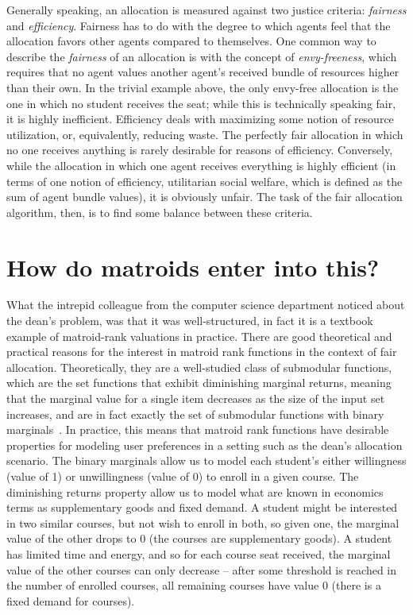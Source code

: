 Generally speaking, an allocation is measured against two justice criteria: \textit{fairness} and \textit{efficiency}. Fairness has to do with the degree to which agents feel that the allocation favors other agents compared to themselves. One common way to describe the \textit{fairness} of an allocation is with the concept of \textit{envy-freeness}, which requires that no agent values another agent's received bundle of resources higher than their own. In the trivial example above, the only envy-free allocation is the one in which no student receives the seat; while this is technically speaking fair, it is highly inefficient. Efficiency deals with maximizing some notion of resource utilization, or, equivalently, reducing waste. The perfectly fair allocation in which no one receives anything is rarely desirable for reasons of efficiency. Conversely, while the allocation in which one agent receives everything is highly efficient (in terms of one notion of efficiency, utilitarian social welfare, which is defined as the sum of agent bundle values), it is obviously unfair. The task of the fair allocation algorithm, then, is to find some balance between these criteria.

\section*{How do matroids enter into this?}
What the intrepid colleague from the computer science department noticed about the dean's problem, was that it was well-structured, in fact it is a textbook example of matroid-rank valuations in practice. There are good theoretical and practical reasons for the interest in matroid rank functions in the context of fair allocation. Theoretically, they are a well-studied class of submodular functions, which are the set functions that exhibit diminishing marginal returns, meaning that the marginal value for a single item decreases as the size of the input set increases, and are in fact exactly the set of submodular functions with binary marginals~\cite[Chapter 39]{schrijver-2003}. In practice, this means that matroid rank functions have desirable properties for modeling user preferences in a setting such as the dean's allocation scenario. The binary marginals allow us to model each student's either willingness (value of 1) or unwillingness (value of 0) to enroll in a given course. The diminishing returns property allow us to model what are known in economics terms as supplementary goods and fixed demand. A student might be interested in two similar courses, but not wish to enroll in both, so given one, the marginal value of the other drops to 0 (the courses are supplementary goods). A student has limited time and energy, and so for each course seat received, the marginal value of the other courses can only decrease -- after some threshold is reached in the number of enrolled courses, all remaining courses have value 0 (there is a fixed demand for courses).

